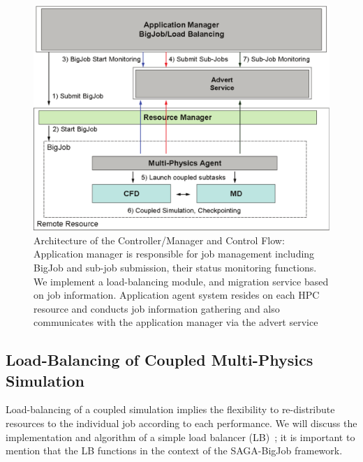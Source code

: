 \documentclass[preprint,12pt]{elsarticle}
\begin{document}
\begin{figure}
\centering
\includegraphics[width=0.8\linewidth]{Structure_of_BigJob}
\caption{\small Architecture of the Controller/Manager and Control Flow: Application manager is responsible for job management including BigJob and sub-job submission, their status monitoring functions. We implement a load-balancing module, and migration service based on job information. Application agent system resides on each HPC resource and conducts job information gathering and also communicates with the application manager via the advert service}
\label{Fig:BigJob_Structure}
\vspace{-1em}
\end{figure}


\subsection{Load-Balancing of Coupled Multi-Physics Simulation}
Load-balancing of a coupled simulation implies the flexibility to re-distribute resources 
to the individual job according to each performance. We will discuss 
the implementation and algorithm of a simple load balancer (LB)~\cite{Ko}; 
it is important to mention that the LB functions in the context of the SAGA-BigJob framework.
\end{document}
